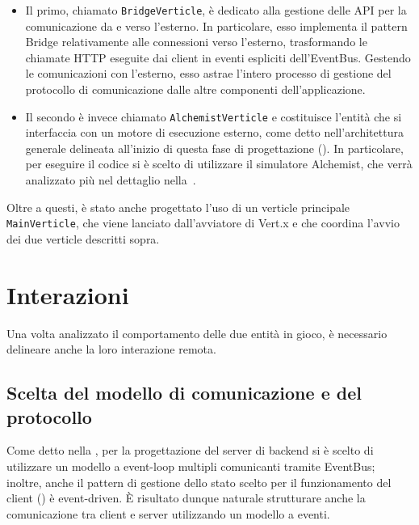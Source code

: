       \begin{itemize}
        \item
          Il primo, chiamato \texttt{BridgeVerticle}, è dedicato alla gestione delle API per la comunicazione da e verso l'esterno.
          In particolare, esso implementa il pattern Bridge relativamente alle connessioni verso l'esterno, trasformando le chiamate HTTP eseguite dai client in eventi espliciti dell'EventBus.
          Gestendo le comunicazioni con l'esterno, esso astrae l'intero processo di gestione del protocollo di comunicazione dalle altre componenti dell'applicazione.
        \item
          Il secondo è invece chiamato \texttt{AlchemistVerticle} e costituisce l'entità che si interfaccia con un motore di esecuzione esterno,
          come detto nell'architettura generale delineata all'inizio di questa fase di progettazione ().
          In particolare, per eseguire il codice si è scelto di utilizzare il simulatore Alchemist, che verrà analizzato più nel dettaglio nella~.
      \end{itemize}

      Oltre a questi, è stato anche progettato l'uso di un verticle principale \texttt{MainVerticle}, che viene lanciato dall'avviatore di Vert.x e che coordina l'avvio dei due verticle descritti sopra.

    

  \section{Interazioni}\label{sec:arch:interaction}

    Una volta analizzato il comportamento delle due entità in gioco, è necessario delineare anche la loro interazione remota.

    \subsection{Scelta del modello di comunicazione e del protocollo}

      Come detto nella , per la progettazione del server di backend si è scelto di utilizzare un modello a event-loop multipli comunicanti tramite EventBus;
      inoltre, anche il pattern di gestione dello stato scelto per il funzionamento del client () è event-driven.
      È risultato dunque naturale strutturare anche la comunicazione tra client e server utilizzando un modello a eventi.


